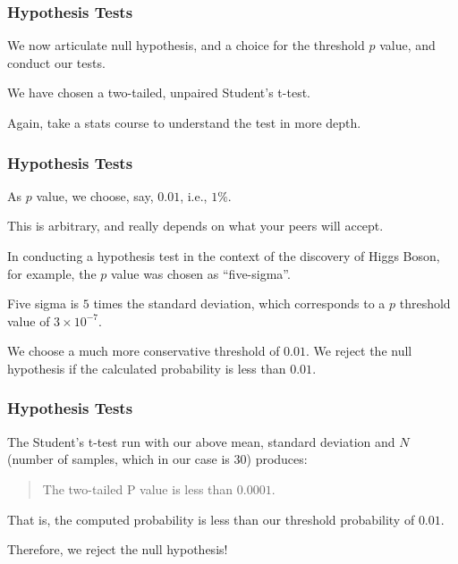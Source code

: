 \begin{frame}
\frametitle{Hypothesis Tests}
\begin{changemargin}{1cm}

We now articulate null hypothesis,
and a choice for the threshold $p$ value, and conduct our tests.

We have chosen a two-tailed, unpaired
Student's t-test. 

Again, take a stats course
to understand the test in more depth.

\end{changemargin}
\end{frame}

\begin{frame}
\frametitle{Hypothesis Tests}
\begin{changemargin}{1cm}

As $p$ value, we choose, say, $0.01$, i.e., $1\%$. 

This is arbitrary, and really depends on what your peers will accept.

In conducting a hypothesis test in the context of the discovery
of Higgs Boson, for example, the $p$ value was chosen as
``five-sigma''.

Five sigma is $5$ times the standard deviation, which
corresponds to a $p$ threshold value of $3\times 10^{-7}$.

We choose a much more conservative threshold of $0.01$.
We reject the null hypothesis if the calculated probability
is less than $0.01$.


\end{changemargin}
\end{frame}

\begin{frame}
\frametitle{Hypothesis Tests}
\begin{changemargin}{1cm}

The Student's t-test run with our above mean, standard deviation
and $N$ (number of samples, which in our case is $30$) produces:

\begin{quote}
    The two-tailed P value is less than $0.0001$.
\end{quote}

That is, the computed probability is less than our threshold
probability of $0.01$.

 Therefore, we reject the null hypothesis!

\end{changemargin}
\end{frame}

